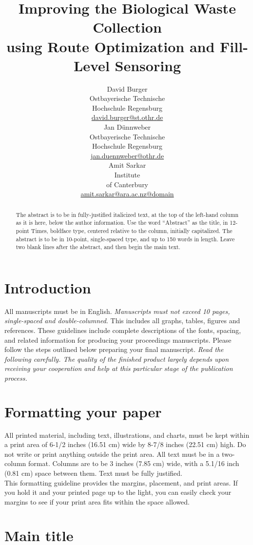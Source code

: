 \documentclass[10pt]{article}
\title{Improving the Biological Waste Collection \\ using Route Optimization and Fill-Level Sensoring}
\author{David Burger\\
  Ostbayerische Technische \\ Hochschule Regensburg \\
  {\underline{ david.burger@st.othr.de}} \\\And
  Jan D{\"u}nnweber  \\
  Ostbayerische Technische \\ Hochschule Regensburg \\
  {\underline{ jan.duennweber@othr.de} }\\\And 
  Amit Sarkar \\
  Institute \\ of Canterbury \\
  {\underline{amit.sarkar@ara.ac.nz@domain}} \\}
\date{}
\begin{document}
\maketitle
\begin{abstract}
The abstract is to be in fully-justified italicized text, at the top of the left-hand column as it is here, below the author information. Use the word “Abstract” as the title, in 12-point Times, boldface type, centered relative to the column, initially capitalized. The abstract is to be in 10-point, single-spaced type, and up to 150 words in length. Leave two blank lines after the abstract, and then begin the main text. 

\end{abstract}

\section{Introduction}

All manuscripts must be in English. {\em Manuscripts must not exceed 10 pages, single-spaced and double-columned}.  This includes all graphs, tables, figures and references. These guidelines include complete descriptions of the fonts, spacing, and related information for producing your proceedings manuscripts. Please follow the steps outlined below preparing your final manuscript. {\em Read the following carefully. The quality of the finished product largely depends upon receiving your cooperation and help at this particular stage of the publication process.}


\section{Formatting your paper}

All printed material, including text, illustrations, and charts, must be kept within a print area of 6-1/2 inches (16.51 cm) wide by 8-7/8 inches (22.51 cm) high. Do not write or print anything outside the print area. All text must be in a two-column format. Columns are to be 3 inches (7.85 cm) wide, with a 5.1/16 inch (0.81 cm) space between them. Text must be fully justified. \\
This formatting guideline provides the margins, placement, and print areas. If you hold it and your printed page up to the light, you can easily check your margins to see if your print area fits within the space allowed.

\section{Main title}
\end{document}
